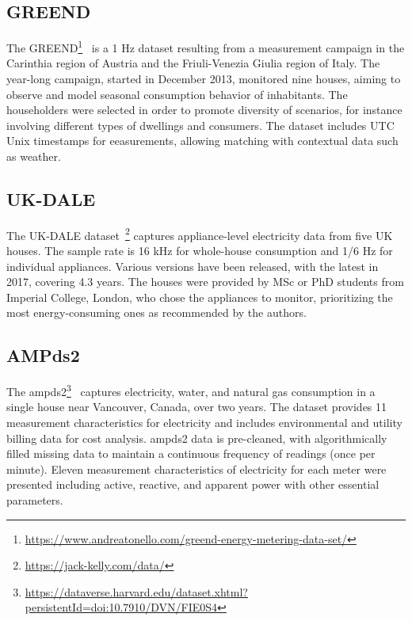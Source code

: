 \subsection{GREEND}

The GREEND\footnote{\url{https://www.andreatonello.com/greend-energy-metering-data-set/}}~\parencite{monacchiGREENDEnergyConsumption2014} is a 1 Hz dataset resulting from a measurement campaign in the Carinthia region of Austria and the Friuli-Venezia Giulia region of Italy. The year-long campaign, started in December 2013, monitored nine houses, aiming to observe and model seasonal consumption behavior of inhabitants. The householders were selected in order to promote diversity of scenarios, for instance involving different types of dwellings and consumers. The dataset includes UTC Unix timestamps for eeasurements, allowing matching with contextual data such as weather.

\subsection{UK-DALE}

The UK-DALE dataset~\parencite{kellyUKDALEDatasetDomestic2015}\footnote{\url{https://jack-kelly.com/data/}} captures appliance-level electricity data from five UK houses. The sample rate is 16 kHz for whole-house consumption and 1/6 Hz for individual appliances. Various versions have been released, with the latest in 2017, covering 4.3 years. The houses were provided by MSc or PhD students from Imperial College, London, who chose the appliances to monitor, prioritizing the most energy-consuming ones as recommended by the authors.


\subsection{AMPds2}

The \acrlong{ampds2}\footnote{\url{https://dataverse.harvard.edu/dataset.xhtml?persistentId=doi:10.7910/DVN/FIE0S4}}~\parencite{makoninElectricityWaterNatural2016} captures electricity, water, and natural gas consumption in a single house near Vancouver, Canada, over two years. The dataset provides 11 measurement characteristics for electricity and includes environmental and utility billing data for cost analysis. \acrshort{ampds2} data is pre-cleaned, with algorithmically filled missing data to maintain a continuous frequency of readings (once per minute). Eleven measurement characteristics of electricity for each meter were presented including active, reactive, and apparent power with other essential parameters.

